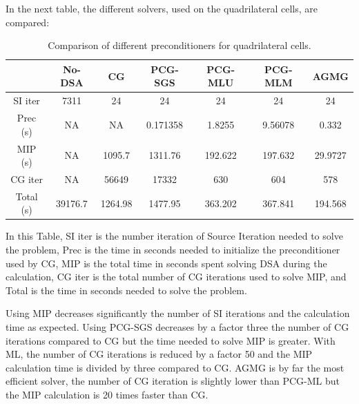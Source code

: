 In the next table, the different solvers, used on the quadrilateral cells, 
are compared:
\begin{table}[H]
\begin{center}
\caption{Comparison of different preconditioners for quadrilateral cells.}
\begin{tabular}{|c|c|c|c|c|c|c|}
\hline
& No-DSA & CG & PCG-SGS &  PCG-MLU & PCG-MLM & AGMG\\
\hline
SI iter   & 7311    & 24      & 24       & 24      & 24      & 24      \\
Prec (s)  & NA      & NA      & 0.171358 & 1.8255  & 9.56078 & 0.332   \\
MIP (s)   & NA      & 1095.7  & 1311.76  & 192.622 & 197.632 & 29.9727 \\
CG iter   & NA      & 56649   & 17332    & 630     & 604     & 578     \\
Total (s) & 39176.7 & 1264.98 & 1477.95  & 363.202 & 367.841 & 194.568 \\
\hline
\end{tabular}
\end{center}
\end{table}
In this Table, SI iter is the number iteration of Source Iteration
needed to solve the problem, Prec is the time in seconds needed to
initialize the preconditioner used by CG, MIP is the total time in
seconds spent solving DSA during the calculation, CG iter is the total number 
of CG iterations used to solve MIP, and Total is the time in
seconds needed to solve the problem.

Using MIP decreases significantly the number of SI iterations and the
calculation time as expected. Using PCG-SGS decreases by a 
factor three the number of CG iterations compared to CG but the time 
needed to solve MIP is greater. With ML, the number of CG iterations is 
reduced by a factor 50 and the MIP calculation time is divided by three 
compared to CG. AGMG is by far the most efficient solver, the number of 
CG iteration is slightly lower than PCG-ML but the MIP calculation is 20 
times faster than CG.

